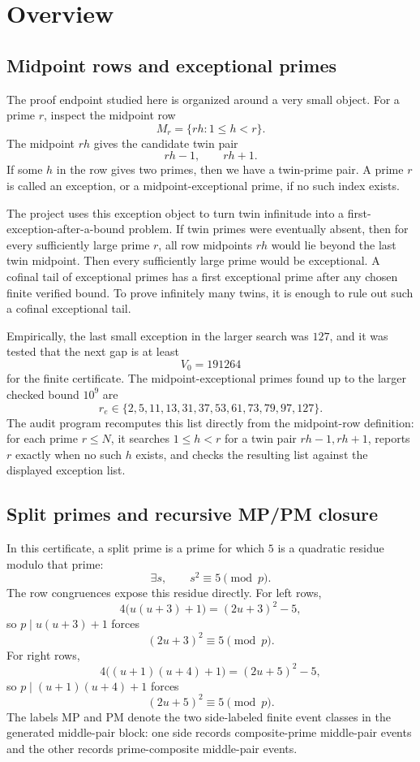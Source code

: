 \documentclass[11pt]{article}
\newcommand{\Code}[1]{\texttt{\seqsplit{#1}}}
\begin{document}
\clearpage
\tableofcontents
\clearpage

\section{Overview}
\noindent

\subsection{Midpoint rows and exceptional primes}

The proof endpoint studied here is organized around a very small object.
For a prime \(r\), inspect the midpoint row
\[
  M_r=\{rh:1\le h<r\}.
\]
The midpoint \(rh\) gives the candidate twin pair
\[
  rh-1,\qquad rh+1.
\]
If some \(h\) in the row gives two primes, then we have a twin-prime pair.
A prime \(r\) is called an exception, or a midpoint-exceptional prime, if
no such index exists.

The project uses this exception object to turn twin infinitude into a
first-exception-after-a-bound problem.  If twin primes were eventually absent,
then for every sufficiently large prime \(r\), all row midpoints \(rh\) would
lie beyond the last twin midpoint.  Then every sufficiently large prime would
be exceptional.  A cofinal tail of exceptional primes has a first exceptional
prime after any chosen finite verified bound.  To prove infinitely many twins,
it is enough to rule out such a cofinal exceptional tail.

Empirically, the last small exception in the larger search was \(127\), and it
was tested that the next gap is at least
\[
  V_0=191264
\]
for the finite certificate.  The midpoint-exceptional primes found up to the
larger checked bound \(10^9\) are
\[
  r_e\in\{2,5,11,13,31,37,53,61,73,79,97,127\}.
\]
The audit program \Code{tools/check\_midpoint\_exceptions.cpp} recomputes this
list directly from the midpoint-row definition: for each prime \(r\le N\), it
searches \(1\le h<r\) for a twin pair \(rh-1,rh+1\), reports \(r\) exactly when
no such \(h\) exists, and checks the resulting list against the displayed
exception list.

\subsection{Split primes and recursive MP/PM closure}

In this certificate, a split prime is a prime for which \(5\) is a quadratic
residue modulo that prime:
\[
  \exists s,\qquad s^2\equiv5\pmod p.
\]
The row congruences expose this residue directly.  For left rows,
\[
  4\bigl(u(u+3)+1\bigr)=(2u+3)^2-5,
\]
so \(p\mid u(u+3)+1\) forces
\[
  (2u+3)^2\equiv5\pmod p.
\]
For right rows,
\[
  4\bigl((u+1)(u+4)+1\bigr)=(2u+5)^2-5,
\]
so \(p\mid (u+1)(u+4)+1\) forces
\[
  (2u+5)^2\equiv5\pmod p.
\]
The labels MP and PM denote the two side-labeled finite event classes in the
generated middle-pair block: one side records composite-prime middle-pair events
and the other records prime-composite middle-pair events.
\end{document}
